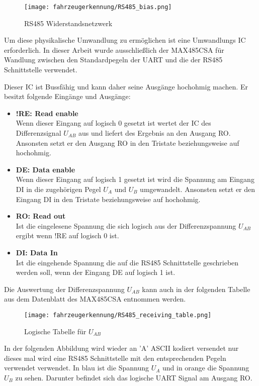 \begin{figure}[H]
    \centering
    \texttt{[image: fahrzeugerkennung/RS485\_bias.png]}
    \caption{RS485 Widerstandsnetzwerk}
\end{figure}

Um diese physikalische Umwandlung zu ermöglichen ist eine Umwandlungs IC erforderlich. In dieser Arbeit wurde ausschließlich der MAX485CSA für Wandlung zwischen den Standardpegeln der UART
und die der RS485 Schnittstelle verwendet.

Dieser IC ist Bussfähig und kann daher seine Ausgänge hochohmig machen. Er besitzt folgende Eingänge und Ausgänge:
\begin{itemize}
    \item \textbf{!RE: Read enable} \\
    Wenn dieser Eingang auf logisch 0 gesetzt ist wertet der IC des Differenzsignal $U_{AB}$ aus und liefert des Ergebnis an den Ausgang RO.
    Ansonsten setzt er den Ausgang RO in den Tristate beziehungsweise auf hochohmig.
    \item \textbf{DE: Data enable} \\
    Wenn dieser Eingang auf logisch 1 gesetzt ist wird die Spannung am Eingang DI in die zugehörigen Pegel $U_{A}$ und $U_{B}$ umgewandelt.
    Ansonsten setzt er den Eingang DI in den Tristate beziehungsweise auf hochohmig.
    \item \textbf{RO: Read out} \\
    Ist die eingelesene Spannung die sich logisch aus der Differenzspannung $U_{AB}$ ergibt wenn !RE auf logisch 0 ist.
    \item \textbf{DI: Data In} \\
    Ist die eingehende Spannung die auf die RS485 Schnittstelle geschrieben werden soll, wenn der Eingang DE auf logisch 1 ist.
\end{itemize}

Die Auswertung der Differenzspannung $U_{AB}$ kann auch in der folgenden Tabelle aus dem Datenblatt des MAX485CSA entnommen werden. 

\begin{figure}[H]
    \centering
    \texttt{[image: fahrzeugerkennung/RS485\_receiving\_table.png]}
    \caption{Logische Tabelle für $U_{AB}$}
\end{figure}

In der folgenden Abbildung wird wieder an 'A' ASCII kodiert versendet nur dieses mal wird eine RS485 Schnittstelle mit den entsprechenden Pegeln verwendet verwendet.
In blau ist die Spannung $U_{A}$ und in orange die Spannung $U_{B}$ zu sehen. Darunter befindet sich das logische UART Signal am Ausgang RO. 

